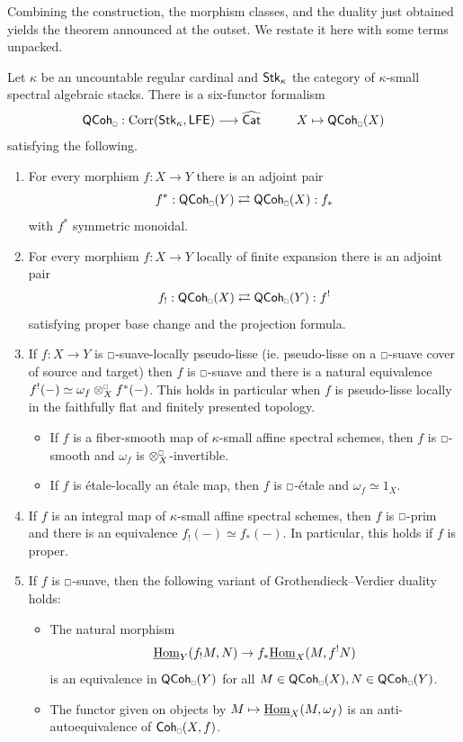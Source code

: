 Combining the construction, the morphism classes, and the duality just obtained yields the theorem announced at the outset. We restate it here with some terms unpacked. 
\begin{theorem}\label{thm: main six-functor formalism}
    Let $\kappa$ be an uncountable regular cardinal and $\mathsf{Stk}_{\kappa}$ the category of $\kappa$-small spectral algebraic stacks. There is a six-functor formalism
    $$\QCoh_{\sld}:\Corr(\Stk_{\kappa},\mathsf{LFE})\longrightarrow\widehat{\Cat} \hspace{1cm} X\mapsto\QCoh_{\sld}(X)$$
    satisfying the following.
    \begin{enumerate}
        \item For every morphism $f: X\to Y$ there is an adjoint pair 
        $$f^{*}:\QCoh_{\sld}(Y)\rightleftarrows\QCoh_{\sld}(X): f_{*}$$ 
        with $f^{*}$ symmetric monoidal.
        \item For every morphism $f: X\to Y$ locally of finite expansion there is an adjoint pair 
        $$f_{!}:\QCoh_{\sld}(X)\rightleftarrows\QCoh_{\sld}(Y): f^{!}$$ 
        satisfying proper base change and the projection formula.
        \item If $f: X\to Y$ is $\msld$-suave-locally pseudo-lisse (ie. pseudo-lisse on a $\msld$-suave cover of source and target) then $f$ is $\msld$-suave and there is a natural equivalence $f^{!}(-)\simeq\omega_{f}\otimes_{X}^{\sld}f^{*}(-)$. This holds in particular when $f$ is pseudo-lisse locally in the faithfully flat and finitely presented topology.
        \begin{itemize}
            \item [(3.1)] If $f$ is a fiber-smooth map of $\kappa$-small affine spectral schemes, then $f$ is $\msld$-smooth and $\omega_{f}$ is $\otimes_{X}^{\sld}$-invertible. 
            \item [(3.2)] If $f$ is \'{e}tale-locally an \'{e}tale map, then $f$ is $\msld$-\'{e}tale and $\omega_{f}\simeq1_{X}$.
        \end{itemize}
        \item If $f$ is an integral map of $\kappa$-small affine spectral schemes, then $f$ is $\msld$-prim and there is an equivalence $f_{!}(-)\simeq f_{*}(-)$. In particular, this holds if $f$ is proper. 
        \item If $f$ is $\msld$-suave, then the following variant of Grothendieck--Verdier duality holds: 
        \begin{itemize}
            \item [(5.1)] The natural morphism 
            $$\underline{\mathrm{Hom}}_{Y}(f_{!}M,N)\to f_{*}\underline{\mathrm{Hom}}_{X}(M,f^{!}N)$$ 
            is an equivalence in $\QCoh_{\sld}(Y)$ for all $M\in\QCoh_{\sld}(X),N\in\QCoh_{\sld}(Y)$. 
            \item [(5.2)] The functor given on objects by $M\mapsto\underline{\mathrm{Hom}}_{X}(M,\omega_{f})$ is an anti-autoequivalence of $\Coh_{\sld}(X,f)$.
        \end{itemize}
    \end{enumerate}
\end{theorem}
